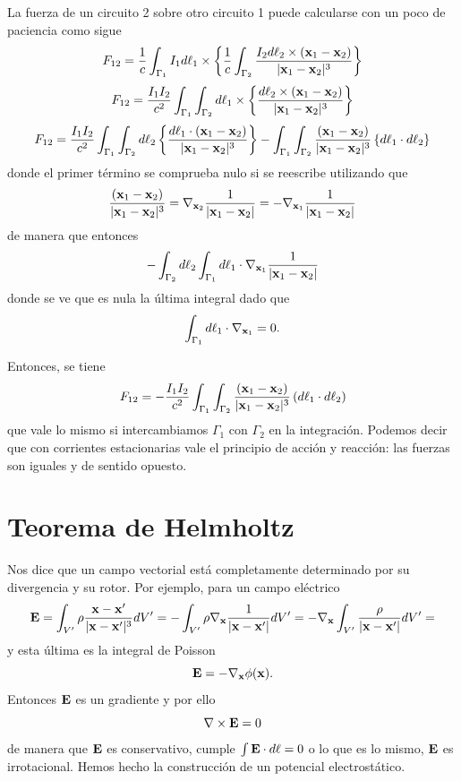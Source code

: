 \documentclass[10pt,oneside]{CBFT_book}
\begin{document}
La fuerza de un circuito 2 sobre otro circuito 1 puede calcularse con un poco de paciencia como sigue
\[
	F_{12} = \frac{1}{c} \int_{\Gamma_1} I_1 d\vb{\ell}_1 \times \left\{
	\frac{1}{c} \int_{\Gamma_2} \frac{I_2 d\vb{\ell}_2 \times (\vb{x}_1 - \vb{x}_2)}{|\vb{x}_1 - \vb{x}_2|^3} 
	\right\}
\]
\[
	F_{12} = \frac{I_1 I_2}{c^2} \int_{\Gamma_1} \int_{\Gamma_2} d\vb{\ell}_1 \times \left\{
	\frac{d\vb{\ell}_2 \times (\vb{x}_1 - \vb{x}_2)}{|\vb{x}_1 - \vb{x}_2|^3} 
	\right\}
\]
\[
	F_{12} = \frac{I_1 I_2}{c^2} \int_{\Gamma_1} \int_{\Gamma_2} d\vb{\ell}_2  \left\{
	\frac{d\vb{\ell}_1 \cdot (\vb{x}_1 - \vb{x}_2)}{|\vb{x}_1 - \vb{x}_2|^3} 
	\right\} - \int_{\Gamma_1} \int_{\Gamma_2} \frac{ (\vb{x}_1 - \vb{x}_2)}{|\vb{x}_1 - \vb{x}_2|^3} 
	\left\{ d\vb{\ell}_1 \cdot d\vb{\ell}_2 \right\}
\]
donde el primer término se comprueba nulo si se reescribe utilizando que
\[
	\frac{ (\vb{x}_1 - \vb{x}_2)}{|\vb{x}_1 - \vb{x}_2|^3} = 
	\nabla_{\vb{x}_2} \frac{ 1 }{|\vb{x}_1 - \vb{x}_2|} =
	- \nabla_{\vb{x}_1} \frac{ 1 }{|\vb{x}_1 - \vb{x}_2|} 
\]
de manera que entonces
\[
	- \int_{\Gamma_2} d\vb{\ell}_2  \int_{\Gamma_1} d\vb{\ell}_1 \cdot \nabla_{\vb{x}_1} \frac{ 1 }{|\vb{x}_1 - \vb{x}_2|} 
\]
donde se ve que es nula la última integral dado que 
\[
	\int_{\Gamma_1} d\vb{\ell}_1 \cdot \nabla_{\vb{x}_1} = 0.
\]

Entonces, se tiene 
\[
	F_{12} = - \frac{I_1 I_2}{c^2} \int_{\Gamma_1} \int_{\Gamma_2} \frac{ (\vb{x}_1 - \vb{x}_2)}{|\vb{x}_1 - \vb{x}_2|^3} 
	\left( d\vb{\ell}_1 \cdot d\vb{\ell}_2 \right)
\]
que vale lo mismo si intercambiamos $\Gamma_1$ con $\Gamma_2$ en la integración. Podemos decir que con corrientes estacionarias
vale el principio de acción y reacción: las fuerzas son iguales y de sentido opuesto.


\section{Teorema de Helmholtz}

Nos dice que un campo vectorial está completamente determinado por su divergencia y su rotor.
Por ejemplo, para un campo eléctrico 
\[
	\vb{E} = \int_{V'} \rho \frac{\vb{x} - \vb{x}'}{|\vb{x} - \vb{x}'|^3} dV' = 
		- \int_{V'} \rho \nabla_{\vb{x}} \frac{ 1 }{|\vb{x} - \vb{x}'|} dV' = 
		- \nabla_{\vb{x}} \int_{V'}   \frac{ \rho }{|\vb{x} - \vb{x}'|} dV' = 
\]
y esta última es la integral de Poisson
\[
	\vb{E} = - \nabla_{\vb{x}} \phi (\vb{x}).
\]
Entonces $\vb{E}$ es un gradiente y por ello 
\[
	\nabla  \times \vb{E} = 0
\]
de manera que $\vb{E}$ es conservativo, cumple $\int \vb{E}\cdot d\vb{\ell} = 0$ o lo que
es lo mismo, $\vb{E}$ es irrotacional.
Hemos hecho la construcción de un potencial electrostático.
\end{document}
